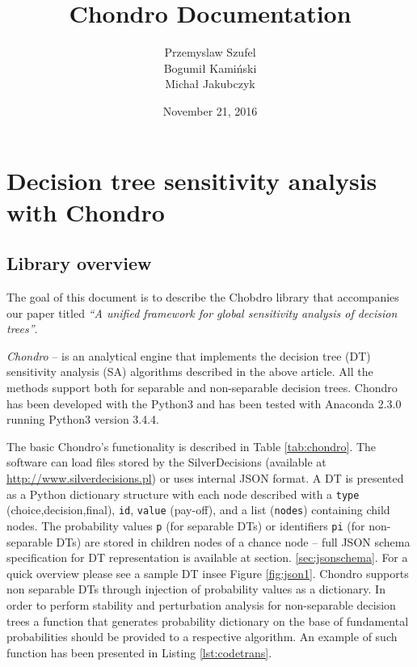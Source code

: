 \documentclass[a4paper,10pt,english]{sphinxmanual}
\title{Chondro Documentation}
\date{November 21, 2016}
\author{Przemyslaw Szufel \\ Bogumi{\l} Kami\'{n}ski \\ Micha{\l} Jakubczyk }
\begin{document}
	\lstset{language=Python}
	\maketitle

	
\chapter{Decision tree sensitivity analysis with Chondro}

\section{Library overview}
	The goal of this document is to describe the Chobdro library that accompanies our paper titled \emph{``A unified framework for global sensitivity analysis of decision trees''}.

	\emph{Chondro} -- is an analytical engine that implements the decision tree (DT) sensitivity analysis (SA) algorithms described in the above article. All the methods support both for separable and non-separable decision trees. Chondro has been developed with the Python3 and has been tested with Anaconda 2.3.0 running Python3 version 3.4.4. 
	
	The basic Chondro's functionality is described in Table \ref{tab:chondro}. The software can load files stored by the \mbox{SilverDecisions} (available at \url{http://www.silverdecisions.pl}) or uses internal JSON format. A DT is presented as a Python dictionary structure with each node described with a \texttt{type} (choice,decision,final), \texttt{id}, \texttt{value} (pay-off), and a list (\texttt{nodes}) containing child nodes. The probability values \texttt{p} (for separable DTs) or identifiers \texttt{pi} (for non-separable DTs)  are stored in children nodes of a chance node -- full JSON schema specification for DT representation is available at section.  \ref{sec:jsonschema}. For a quick overview please see a sample DT insee Figure \ref{fig:json1}.
	Chondro supports non separable DTs through  injection of probability values as a dictionary. In order to perform stability and perturbation analysis for non-separable decision trees a function that generates probability dictionary on the base of fundamental probabilities should be provided to a respective algorithm. An example of such function has been presented in Listing \ref{lst:codetrans}.
	
\end{document}
